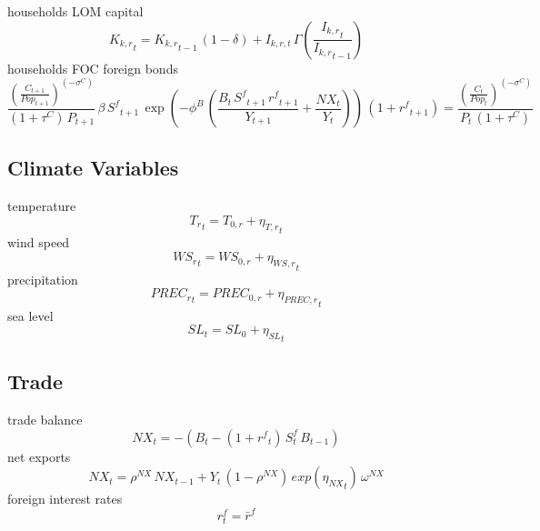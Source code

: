 households LOM capital
\begin{dmath}
{{K_{k,r}}_{t}}={{K_{k,r}}_{t-1}}\, \left(1-{{\delta}}\right) + I_{k,r,t} \, \Gamma\left(\frac{{{I_{k,r}}_{t}}}{{{I_{k,r}}_{t-1}}}\right)
\end{dmath}
households FOC foreign bonds
\begin{dmath}
\frac{\left(\frac{{C}_{t+1}}{{Pop}_{t+1}}\right)^{\left(-{{\sigma^{C}}}\right)}}{\left(1+{{\tau^{C}}}\right)\, {P}_{t+1}}\, {{\beta}}\, {S^{f}}_{t+1}\, \exp\left(-\phi^{B}\, \left(\frac{{B}_{t}\, {S^{f}}_{t+1}\, {{r^{f}}}_{t+1}}{{Y}_{t+1}}+\frac{{NX}_{t}}{{Y}_{t}}\right)\right)\, \left(1+{{r^{f}}}_{t+1}\right)=\frac{\left(\frac{{C}_{t}}{{Pop}_{t}}\right)^{\left(-{{\sigma^{C}}}\right)}}{{P}_{t}\, \left(1+{{\tau^{C}}}\right)}
\end{dmath}

\subsection{Climate Variables}
temperature
\begin{dmath}
{{T_{r}}_{t}}={{T_{0,r}}}+{{\eta_{T,r}}_{t}}
\end{dmath}
wind speed
\begin{dmath}
{{WS_{r}}_{t}}={{WS_{0,r}}}+{{\eta_{WS,r}}_{t}}
\end{dmath}
precipitation
\begin{dmath}
{{PREC_{r}}_{t}}={{PREC_{0,r}}}+{{\eta_{PREC,r}}_{t}}
\end{dmath}
sea level
\begin{dmath}
{{SL}_{t}}={{SL_0}}+{{\eta_{SL}}_{t}}
\end{dmath}

\subsection{Trade}
trade balance
\begin{dmath}
{NX_{t}}=-\left({B_{t}}-\left(1+{{r^{f}}_{t}}\right) \, S^{f}_{t} \, {B_{t-1}}\right)
\end{dmath}
net exports
\begin{dmath}
{NX_{t}}={{\rho^{NX}}}\, {NX_{t-1}}+{Y_{t}}\, \left(1-{{\rho^{NX}}}\right)\, exp\left({{\eta_{NX}}_{t}}\right)\, {{\omega^{NX}}}
\end{dmath}
foreign interest rates
\begin{dmath}
r^{f}_{t} = \bar{r}^{f}
\end{dmath}

